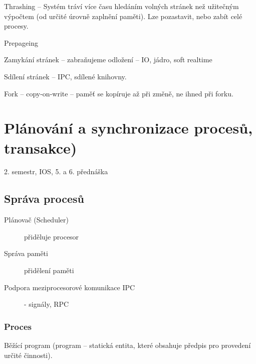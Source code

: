 \documentclass[a4wide]{report}
\begin{document}
Thrashing -- Systém tráví více času hledáním volných stránek než užitečným výpočtem (od určité úrovně zaplnění paměti). Lze pozastavit, nebo zabít celé procesy.

Prepageing

Zamykání stránek -- zabraňujeme odložení -- IO, jádro, soft realtime

Sdílení stránek -- IPC, sdílené knihovny.

Fork -- copy-on-write -- paměť se kopíruje až při změně, ne ihned při forku.

























\chapter{Plánování a synchronizace procesů, transakce)} \label{cha:35}

2. semestr, IOS, 5. a 6. přednáška

\section{Správa procesů}

\begin{description}
	\item[Plánovač (Scheduler)]přiděluje procesor
	\item[Správa paměti] přidělení paměti
	\item[Podpora meziprocesorové komunikace IPC] - signály, RPC
\end{description}

\subsection{Proces}
Běžící program (program -- statická entita, které obsahuje předpis pro provedení určité činnosti).
\end{document}
